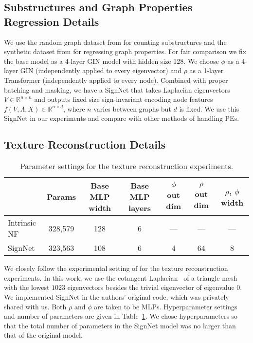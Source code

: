 \documentclass{article} \usepackage{iclr2023_conference,times}
\newcommand{\RR}{\mathbb R}
\begin{document}
\subsection{Substructures and Graph Properties Regression Details}\label{sec:appdx count}
We use the random graph dataset from \cite{chen2020can} for counting substructures and the synthetic dataset from \cite{corso2020principal} for regressing graph properties. For fair comparison we fix the base model as a 4-layer GIN model with hidden size 128.
We choose $\phi$ as a 4-layer GIN (independently applied to every eigenvector) and $\rho$ as a 1-layer Transformer (independently applied to every node). Combined with proper batching and masking, we have a SignNet that takes Laplacian eigenvectors $V \in \RR^{n \times n}$ and outputs fixed size sign-invariant encoding node features $f(V, \Lambda, X) \in \RR^{n \times d}$, where $n$ varies between graphs but $d$ is fixed. We use this SignNet in our experiments and compare with other methods of handling PEs.

\subsection{Texture Reconstruction Details}\label{appendix:texture}

\begin{table}[ht]
    \centering
    \caption{Parameter settings for the texture reconstruction experiments.}
    {\small
    \begin{tabular}{lcccccc}
    \toprule
         & Params & Base MLP width & Base MLP layers & $\phi$ out dim & $\rho$ out dim & $\rho$, $\phi$ width \\
        \midrule
         Intrinsic NF & 328,579 & 128 & 6 &---&--- & ---\\
         SignNet & 323,563 & 108 & 6 & 4 & 64 & 8 \\
        \bottomrule
    \end{tabular}
    }
    \label{tab:texture_parameters}
\end{table}

We closely follow the experimental setting of \cite{koestler2022intrinsic} for the texture reconstruction experiments. In this work, we use the cotangent Laplacian~\citep{rustamov2007laplace} of a triangle mesh with the lowest $1023$ eigenvectors besides the trivial eigenvector of eigenvalue 0. We implemented SignNet in the authors' original code, which was privately shared with us. Both $\rho$ and $\phi$ are taken to be MLPs. Hyperparameter settings and number of parameters are given in Table~\ref{tab:texture_parameters}. We chose hyperparameters so that the total number of  parameters in the SignNet model was no larger than that of the original model.
\end{document}
